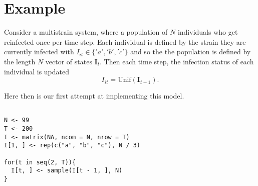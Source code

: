 \documentclass{article}
\begin{document}
\section{Example}


Consider a multistrain system, where a population of $N$ individuals who get reinfected once per time step. 
Each individual is defined by the strain they are currently infected with $I_{it} \in \{'a', 'b', 'c'\}$ and so the the population is defined by the length $N$ vector of states $\mathbf{I}_t$.
Then each time step, the infection status of each individual is updated
$$I_{it} = \text{Unif}(\mathbf{I}_{t-1}).$$

Here then is our first attempt at implementing this model.

\begin{lstlisting}

N <- 99
T <- 200
I <- matrix(NA, ncom = N, nrow = T)
I[1, ] <- rep(c("a", "b", "c"), N / 3)

for(t in seq(2, T)){
  I[t, ] <- sample(I[t - 1, ], N)
}
\end{lstlisting}
\end{document}
